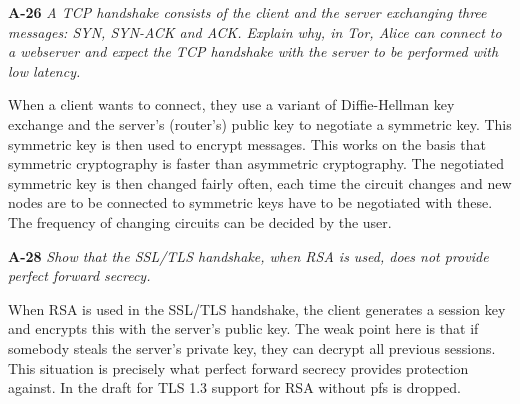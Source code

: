 \documentclass[a4paper]{article}
\newcommand{\Q}[2]{ \vspace{10pt} \textbf{#1} \textit{#2} }
\newcommand{\A}[1]{ #1 }
\begin{document}
\Q{A-26} {
  A TCP handshake consists of the client and the server exchanging 
  three messages: SYN, SYN-ACK and ACK. 
  Explain why, in Tor, Alice can connect to a webserver and expect 
  the TCP handshake with the
  server to be performed with low latency.
}

\A{
  When a client wants to connect, they use a variant of Diffie-Hellman
  key exchange and the server's (router's) public key to negotiate a symmetric 
  key. This symmetric key is then used to encrypt messages.  
  This works on the basis that symmetric cryptography is faster 
  than asymmetric cryptography.
  The negotiated symmetric key is then changed fairly often, 
  each time the circuit changes and new nodes are to be connected to
  symmetric keys have to be negotiated with these.
  The frequency of changing circuits can be decided by the user.
}

\Q{A-28} {
  Show that the SSL/TLS handshake, when RSA is used, 
  does not provide perfect forward secrecy.
}

\A{
  When RSA is used in the SSL/TLS handshake, the client generates a session key
  and encrypts this with the server's public key.
  The weak point here is that if somebody steals the server's private key,
  they can decrypt all previous sessions. This situation is precisely what 
  perfect forward secrecy provides protection against. 
  In the draft for TLS 1.3 support for RSA without pfs is dropped.
}
\end{document}
